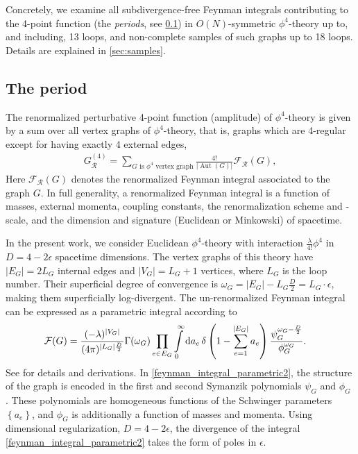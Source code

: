 \documentclass[11pt,a4paper]{article}
\newcommand{\abs}[1]{\lvert #1 \rvert}
\renewcommand{\d}{\textnormal{d}}
\newcommand{\ren} {{  \mathcal R}}
\newcommand{\Aut}{\operatorname{Aut}}
\renewcommand{\|}{\rule[-0.4ex]{0.2ex}{1.2em}}
\begin{document}
	Concretely, we examine all  subdivergence-free Feynman integrals contributing to the 4-point function (the \emph{periods}, see \cref{sec:period}) in $O(N)$-symmetric $\phi^4$-theory up to, and including, 13 loops, and non-complete samples of such graphs up to 18 loops. Details are explained in \cref{sec:samples}. 	

	
	\subsection{The period}\label{sec:period}
	The renormalized perturbative 4-point function (amplitude) of $\phi^4$-theory is given by a sum over all vertex graphs of $\phi^4$-theory, that is, graphs which are 4-regular except for having exactly 4 external edges, 
	\begin{align}\label{perturbation_series}
		G_\ren^{(4)}=\sum_{G \text{ is $\phi^4$ vertex graph}} \frac{4!}{\abs{\Aut(G)}} \mathcal F_\ren(G), 
	\end{align}
	Here $\mathcal F_\ren(G)$ denotes the renormalized Feynman integral associated to the graph $G$. 
	In full generality, a renormalized Feynman integral is a function of masses, external momenta, coupling constants, the renormalization scheme and -scale, and the dimension and signature (Euclidean or Minkowski) of spacetime. 
	
	In the present work, we consider  Euclidean $\phi^4$-theory with interaction $\frac{\lambda}{4!}\phi^4$ in  $D=4-2\epsilon$ spacetime dimensions. The vertex graphs of this theory have $\abs{E_G}=2 L_G$ internal edges and $\abs{V_G}= L_G+1$ vertices, where $L_G$ is the loop number. Their superficial degree of convergence   is $\omega_G=\abs{E_G}-  L_G \frac D 2=L_G\cdot \epsilon$, making them superficially log-divergent. 
	The un-renormalized Feynman integral can be expressed as a parametric integral according to  
	\begin{align}\label{feynman_integral_parametric2}
		\mathcal F (G) &=   \frac{ (- \lambda )^{\abs{V_G}}}{(4\pi)^{\abs{L_G} \frac D 2}}    \Gamma(\omega_G)  \prod_{e\in E_G} \int \limits_0^\infty  \d a_e   \, \delta \left( 1-\sum_{e=1}^{\abs{E_G}} a_e \right) \frac{\psi_G^{\omega_G-\frac D 2}}{\phi_G^{\omega_G}} .
	\end{align}
	See \cite{nakanishi_graph_1971,panzer_feynman_2015} for details and derivations.
	In \cref{feynman_integral_parametric2}, the structure of the graph is encoded in the first and second Symanzik polynomials $\psi_G$ and $\phi_G$ \cite{bogner_feynman_2010}. These polynomials are homogeneous functions of the Schwinger parameters $\left \lbrace a_e \right \rbrace   $, and $\phi_G$ is additionally a function of masses and momenta. Using dimensional regularization, $D=4-2\epsilon$, the divergence of the integral \cref{feynman_integral_parametric2} takes the form of poles in $\epsilon$. 
	
\end{document}
